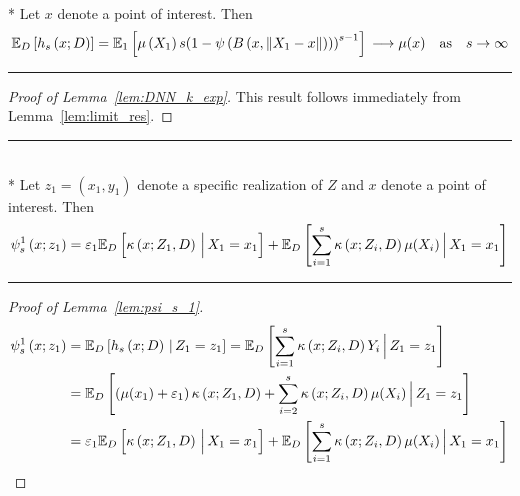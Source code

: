 \begin{lem}\label{lem:DNN_k_exp}\mbox{}\\*
	Let $x$ denote a point of interest.
	Then
	\begin{equation}
		\mathbb{E}_D\left[h_s\left(x; D\right)\right]
		= \mathbb{E}_{1}\left[\mu\left(X_1\right) s{\left(1 - \psi\left(B\left(x, \|X_1 - x\|\right)\right)\right)}^{s-1}\right]\\
		\longrightarrow \mu(x) \quad \text{as} \quad s \rightarrow \infty
	\end{equation}
\end{lem}
\hrule
\begin{proof}[Proof of Lemma~\ref{lem:DNN_k_exp}]
	This result follows immediately from Lemma~\ref{lem:limit_res}.
\end{proof}

\hrule

\begin{lem}\label{lem:psi_s_1}\mbox{}\\*
	Let $z_1 = (x_1, y_1)$ denote a specific realization of $Z$ and $x$ denote a point of interest.
	Then
	\begin{equation}
		\psi_{s}^{1}\left(x; z_1\right)
		= \varepsilon_1 \mathbb{E}_D\left[\kappa\left(x; Z_1, D\right)\, \Big| \, X_1 = x_1 \right]
		+ \mathbb{E}_{D}\left[\sum_{i = 1}^{s} \kappa\left(x; Z_{i}, D\right) \mu(X_{i})\, \Big| \, X_1 = x_1 \right]
	\end{equation}
\end{lem}
\hrule
\begin{proof}[Proof of Lemma~\ref{lem:psi_s_1}]
	\begin{equation}
		\begin{aligned}
			\psi_{s}^{1}\left(x; z_1\right)
			 & = \mathbb{E}_{D}\left[h_{s}\left(x; D\right) \, | \, Z_1 = z_1 \right]
			= \mathbb{E}_{D}\left[\sum_{i = 1}^{s} \kappa\left(x; Z_{i}, D\right) Y_{i} \, \Big| \, Z_1 = z_1 \right] \\
			 & = \mathbb{E}_{D}\left[\left(\mu(x_1) + \varepsilon_1\right)\kappa\left(x; Z_1, D\right)
			+ \sum_{i = 2}^{s} \kappa\left(x; Z_{i}, D\right) \mu(X_{i})\, \Big| \, Z_1 = z_1 \right]         \\
			 & = \varepsilon_1 \mathbb{E}_D\left[\kappa\left(x; Z_1, D\right)\, \Big| \, X_1 = x_1 \right]
			+ \mathbb{E}_{D}\left[\sum_{i = 1}^{s} \kappa\left(x; Z_{i}, D\right) \mu(X_{i})\, \Big| \, X_1 = x_1 \right]
		\end{aligned}
	\end{equation}
\end{proof}
